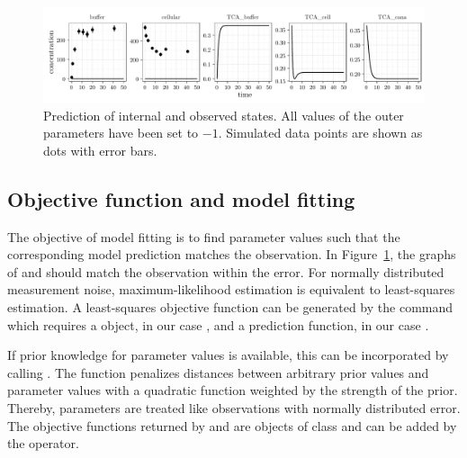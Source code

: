 \documentclass[article]{jss}
\begin{document}
\begin{figure}[ht]
	\centering
	\includegraphics[width = \textwidth]{images/figure3}
	\caption{Prediction of internal and observed states. All values of the outer parameters have been set to $-1$. Simulated data points are shown as dots with error bars.}
	\label{fig:gxp}
\end{figure}

\subsection{Objective function and model fitting}
The objective of model fitting is to find parameter values such that the corresponding model prediction matches the observation. In Figure~\ref{fig:gxp}, the graphs of  and  should match the observation within the error.
For normally distributed measurement noise, maxi\-mum-likelihood estimation is equivalent to least-squares estimation. A least-squares objective function can be generated by the  command which requires a  object, in our case , and a prediction function, in our case .


If prior knowledge for parameter values is available, this can be incorporated by calling . The function penalizes distances between arbitrary prior values and parameter values with a quadratic function weighted by the strength of the prior. Thereby, parameters are treated like observations with normally distributed error. The objective functions returned by  and  are objects of class  and can be added by the  operator.
\end{document}
